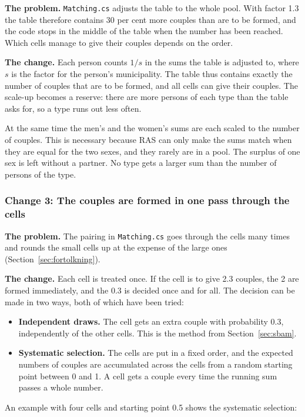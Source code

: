 \documentclass[12pt,a4paper]{article}
\newcommand{\kode}[1]{\texttt{#1}}
\begin{document}
\textbf{The problem.} \kode{Matching.cs} adjusts the table to the whole pool. With factor 1.3 the
table therefore contains 30 per cent more couples than are to be formed, and the code stops in the
middle of the table when the number has been reached. Which cells manage to give their couples
depends on the order.

\textbf{The change.} Each person counts $1/s$ in the sums the table is adjusted to, where $s$ is
the factor for the person's municipality. The table thus contains exactly the number of couples
that are to be formed, and all cells can give their couples. The scale-up becomes a reserve: there
are more persons of each type than the table asks for, so a type runs out less often.

At the same time the men's and the women's sums are each scaled to the number of couples. This is
necessary because RAS can only make the sums match when they are equal for the two sexes, and they
rarely are in a pool. The surplus of one sex is left without a partner. No type gets a larger sum
than the number of persons of the type.

\subsubsection*{Change 3: The couples are formed in one pass through the cells}

\textbf{The problem.} The pairing in \kode{Matching.cs} goes through the cells many times and
rounds the small cells up at the expense of the large ones (Section~\ref{sec:fortolkning}).

\textbf{The change.} Each cell is treated once. If the cell is to give 2.3 couples, the 2 are formed
immediately, and the 0.3 is decided once and for all. The decision can be made in two ways, both of
which have been tried:

\begin{itemize}
\item \textbf{Independent draws.} The cell gets an extra couple with probability 0.3, independently
of the other cells. This is the method from Section~\ref{sec:sbam}.
\item \textbf{Systematic selection.} The cells are put in a fixed order, and the expected numbers
of couples are accumulated across the cells from a random starting point between 0 and 1. A cell
gets a couple every time the running sum passes a whole number.
\end{itemize}

An example with four cells and starting point 0.5 shows the systematic selection:
\end{document}
